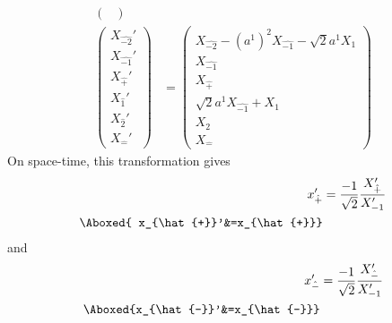 \documentclass[]{article}
\numberwithin{equation}{section}
\begin{document}
{{\begin{align}
\begin{pmatrix}
    \end{pmatrix}\\
    \begin{pmatrix}
    {X}_{\hat{-2}}'\\
    {X}_{\hat{-1}}'\\
    {X}_{\hat{+}}'\\
    {X}_{\hat{1}}'\\
    {X}_{\hat{2}}'\\
    {X}_{\hat{-}}'
    \end{pmatrix}&= \begin{pmatrix}
    {X}_{\hat{-2}}-(a^{1})^{2} {X}_{\hat{-1}}-\sqrt{2}a^{1}{X}_{1}\\
    {X}_{\hat{-1}}\\
    {X}_{\hat{+}}\\
    \sqrt{2}a^{1} {X}_{\hat{-1}}+{X}_{1}\\
    {X}_{2}\\
    {X}_{\hat{-}}
    \end{pmatrix}
\end{align}
On space-time, this transformation gives
\begin{align}
    x_{\hat{+}}'&=\frac{-1}{\sqrt{2}}\frac{{X}_{{\hat{+}}}'}{ {X}_{-1}'}\\
    \Aboxed{ x_{\hat{+}}'&=x_{\hat{+}}}
\end{align}
and
\begin{align}
    x_{\hat{-}}'&=\frac{-1}{\sqrt{2}}\frac{{X}_{\hat{-}}'}{ {X}_{-1}'}\\
    \Aboxed{x_{\hat{-}}'&=x_{\hat{-}}}
\end{align}


}}
\end{document}
